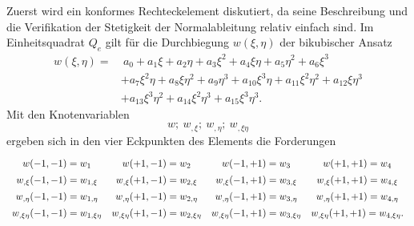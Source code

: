\documentclass[a4paper,10pt,twoside]{article}
\numberwithin{equation}{section} %
\numberwithin{figure}{section}   %
\numberwithin{table}{section}    %
\begin{document}
	Zuerst wird ein konformes Rechteckelement diskutiert, da seine Beschreibung und die Verifikation der Stetigkeit der Normalableitung relativ einfach sind. Im Einheitsquadrat $ Q_{e} $ gilt für die Durchbiegung $ w(\xi, \eta) $ der bikubischer Ansatz
	\begin{equation}\label{equ:platten-ansatz}
	\begin{split}
	w(\xi,\eta) = & \ a_{0} + a_{1}\xi + a_{2}\eta + a_{3}\xi^{2} + a_{4}\xi\eta + a_{5}\eta^{2} + a_{6}\xi^{3} \\
	& + a_{7}\xi^{2}\eta + a_{8}\xi\eta^{2} + a_{9}\eta^{3} + a_{10}\xi^{3}\eta + a_{11}\xi^{2}\eta^{2} + a_{12}\xi\eta^{3} \\
	& + a_{13}\xi^{3}\eta^{2} + a_{14}\xi^{2}\eta^{3} + a_{15}\xi^{3}\eta^{3}.
	\end{split}
	\end{equation}
	Mit den Knotenvariablen
	\begin{equation}\label{equ:platten-knotenvariable}
	w; \ w_{,\xi}; \ w_{,\eta}; \ w_{,\xi\eta}
	\end{equation}
	ergeben sich in den vier Eckpunkten des Elements die Forderungen
	\begin{equation}\label{equ:platten-ansatz-forderungen}
	\renewcommand\arraystretch{1.4}
	\begin{array}{cccc}
	w(-1,-1)=w_{1}                    & w(+1,-1)=w_{2}                    & w(-1,+1)=w_{3}                    & w(+1,+1)=w_{4} \\
	w_{,\xi}(-1,-1)=w_{1,\xi}         & w_{,\xi}(+1,-1)=w_{2,\xi}         & w_{,\xi}(-1,+1)=w_{3,\xi}         & w_{,\xi}(+1,+1)=w_{4,\xi} \\
	w_{,\eta}(-1,-1)=w_{1,\eta}       & w_{,\eta}(+1,-1)=w_{2,\eta}       & w_{,\eta}(-1,+1)=w_{3,\eta}       & w_{,\eta}(+1,+1)=w_{4,\eta} \\
	w_{,\xi\eta}(-1,-1)=w_{1,\xi\eta} & w_{,\xi\eta}(+1,-1)=w_{2,\xi\eta} & w_{,\xi\eta}(-1,+1)=w_{3,\xi\eta} & w_{,\xi\eta}(+1,+1)=w_{4,\xi\eta}.
	\end{array}
	\end{equation}
	
\end{document}
